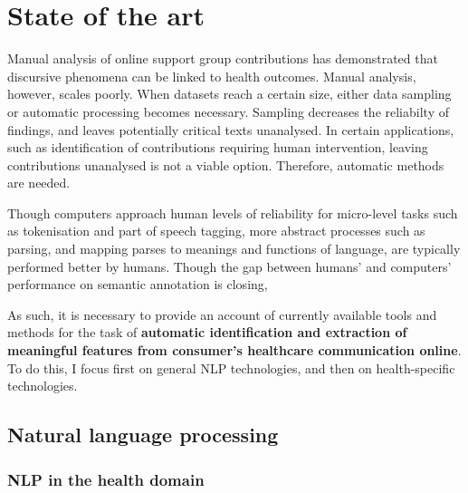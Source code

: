
\chapter{State of the art}

Manual analysis of online support group contributions has demonstrated that discursive phenomena can be linked to health outcomes. Manual analysis, however, scales poorly. When datasets reach a certain size, either data sampling or automatic processing becomes necessary. Sampling decreases the reliabilty of findings, and leaves potentially critical texts unanalysed. In certain applications, such as identification of contributions requiring human intervention, leaving contributions unanalysed is not a viable option. Therefore, automatic methods are needed. 

Though computers approach human levels of reliability for micro-level tasks such as tokenisation and part of speech tagging, more abstract processes such as parsing, and mapping parses to meanings and functions of language, are typically performed better by humans. Though the gap between humans' and computers' performance on semantic annotation is closing, 

As such, it is necessary to provide an account of currently available tools and methods for the task of \textbf{automatic identification and extraction of meaningful  features from consumer's healthcare communication online}. To do this, I focus first on general NLP technologies, and then on health-specific technologies.


\section{Natural language processing}





    \subsection{NLP in the health domain}



